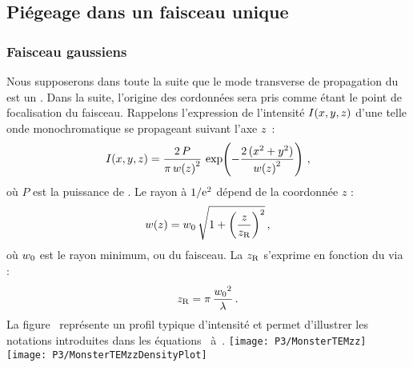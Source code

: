 \casse


\subsection{Piégeage dans un faisceau unique}

\subsubsection{Faisceau gaussiens \temzz}
Nous supposerons dans toute la suite que le mode transverse de propagation du \fl est un \temzz. Dans la suite, l'origine des cordonnées \xyz sera pris comme étant le point de focalisation du faisceau.
Rappelons l'expression de l'intensité ${{I}(x,y,z)}$ d'une telle onde monochromatique se propageant suivant l'axe $z$~\cite{SaT91}:
\begin{equation}
	\Ixyz = \frac{2\,P}{\pi\,\wz^2}\,\Expo{-\dfrac{2\,(x^2+y^2)}{\wz^2}}
	\virguleformule
	\label{eq:ITEMZZ}
\end{equation}
où $P$ %
%
est la puissance de \fl. 
Le rayon à ${{1} / {\rm e^2}}$ dépend de la coordonnée $z$ :
\begin{equation}
	\wz = \wzexpr
	\virguleformule
	\label{eq:WZ}
\end{equation}
où ${w_0}$ %
%
est le rayon minimum, ou  du faisceau. 
La \ldr ${z_{\rm R}}$ %
%
s'exprime en fonction du \waist via :
\begin{equation}
	\zR = \zRexpr
	\pointformule
	\label{eq:ZR}
\end{equation}
La figure~ représente un profil typique d'intensité et permet d'illustrer les notations introduites dans les équations~ à~.
\bfighs
\texttt{[image: P3/MonsterTEMzz]}
\texttt{[image: P3/MonsterTEMzzDensityPlot]}
\label{fig:TEMzz}
\efigh

\casse

